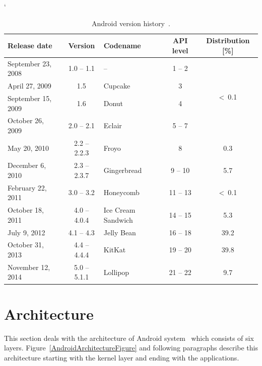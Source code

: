 \begin {table}[h!]
    \catcode`
    \begin{tabular}{|l|c|l|c|c|}
        \hline
        \textbf{Release date} &
        \textbf{Version} &
        \textbf{Codename} &
        \textbf{API level} &
        \multicolumn{1}{p{2.3cm}|}{\centering \textbf{Distribution} [\%]} \\ \hline \hline
        September 23, 2008 & 1.0 -- 1.1   & --                 & 1 -- 2   & \multirow{4}{*}{\textless~0.1}
        \\ \cline{1-4}
        April 27, 2009     & 1.5          & Cupcake            & 3        &                     \\ \cline{1-4}
        September 15, 2009 & 1.6          & Donut              & 4        &                     \\ \cline{1-4}
        October 26, 2009   & 2.0 -- 2.1   & Eclair             & 5 -- 7   &                     \\ \hline
        May 20, 2010       & 2.2 -- 2.2.3 & Froyo              & 8        & 0.3                 \\ \hline
        December 6, 2010   & 2.3 -- 2.3.7 & Gingerbread        & 9 -- 10  & 5.7                 \\ \hline
        February 22, 2011  & 3.0 -- 3.2   & Honeycomb          & 11 -- 13 & \textless~0.1       \\ \hline
        October 18, 2011   & 4.0 -- 4.0.4 & Ice Cream Sandwich & 14 -- 15 & 5.3                 \\ \hline
        July 9, 2012       & 4.1 -- 4.3   & Jelly Bean         & 16 -- 18 & 39.2                \\ \hline
        October 31, 2013   & 4.4 -- 4.4.4 & KitKat             & 19 -- 20 & 39.8                \\ \hline
        November 12, 2014  & 5.0 -- 5.1.1 & Lollipop           & 21 -- 22 & 9.7                 \\ \hline
    \end{tabular}
    \centering
    \caption{Android version history~\cite{Dashboards}.}
    \label{AndroidHistoryTable}
\end{table}

\section{Architecture}\label{AndroidArchitectureSection}
This section deals with the architecture of Android system~\cite{AndroidDevBook} which consists of six layers.
Figure~\ref{AndroidArchitectureFigure} and following paragraphs describe this architecture starting with the kernel
layer and ending with the applications.

